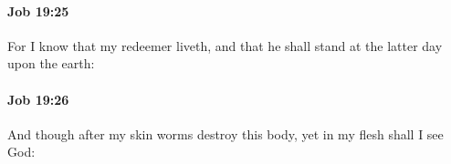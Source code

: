 		\paragraph{Job 19:25} %
			\label{JOB-19-25}

			For I know that my redeemer liveth, and that he shall stand at the latter day upon the earth:


		\paragraph{Job 19:26} %
			\label{JOB-19-26}

			And though after my skin worms destroy this body, yet in my flesh shall I see God:


